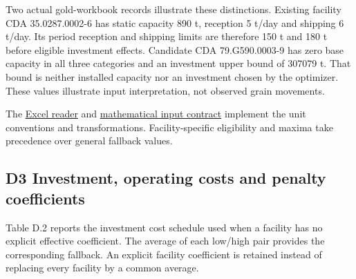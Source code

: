 \documentclass[
  english,
  11pt,
  a4paper,
]{article}
\begin{document}
Two actual gold-workbook records illustrate these distinctions. Existing
facility CDA 35.0287.0002-6 has static capacity 890 t, reception 5 t/day
and shipping 6 t/day. Its period reception and shipping limits are
therefore 150 t and 180 t before eligible investment effects. Candidate
CDA 79.G590.0003-9 has zero base capacity in all three categories and an
investment upper bound of 307079 t. That bound is neither installed
capacity nor an investment chosen by the optimizer. These values
illustrate input interpretation, not observed grain movements.

The
\href{https://github.com/unb-lamfo-or-ai-hpc/model-agrologistic/blob/1b54023f4e0c0c27aba64883b1e9cf25817ad0f8/src/logic/excel_loader.py}{Excel
reader} and
\href{https://github.com/unb-lamfo-or-ai-hpc/model-agrologistic/blob/1b54023f4e0c0c27aba64883b1e9cf25817ad0f8/src/logic/mathematical_contract.py}{mathematical
input contract} implement the unit conventions and transformations.
Facility-specific eligibility and maxima take precedence over general
fallback values.

\subsection{D3 Investment, operating costs and penalty
coefficients}\label{d3-investment-operating-costs-and-penalty-coefficients}

Table D.2 reports the investment cost schedule used when a facility has
no explicit effective coefficient. The average of each low/high pair
provides the corresponding fallback. An explicit facility coefficient is
retained instead of replacing every facility by a common average.
\end{document}
